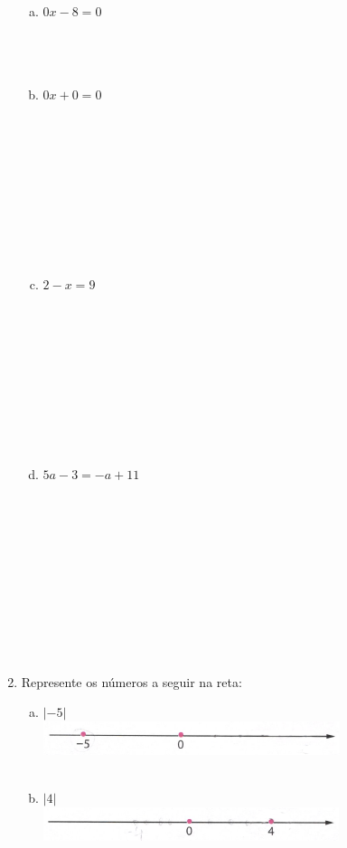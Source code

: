 \documentclass[a4paper,14pt]{article}
\begin{document}
\begin{multicols}{2}
\begin{enumerate}
\begin{enumerate}[a)]
				\item $0x - 8 = 0$ \\\\\\\\
				\item $0x + 0 = 0$ \\\\\\\\\\\\\\\\\\\\
				\item $2 - x = 9$ \\\\\\\\\\\\\\\\\\\\
				\item $5a - 3 = -a + 11$ \\\\\\\\\\\\\\\\\\\\\\
			\end{enumerate}
			\item Represente os números a seguir na reta:
			\begin{enumerate}[a)]
				\item $|-5|$ \\
				\includegraphics[width=1\linewidth]{6FMA126_imagens/imagem2} \\\\
				\item $|4|$ \\
				\includegraphics[width=1\linewidth]{6FMA126_imagens/imagem3} \\\\

\end{enumerate}
\end{enumerate}
\end{multicols}
\end{document}
